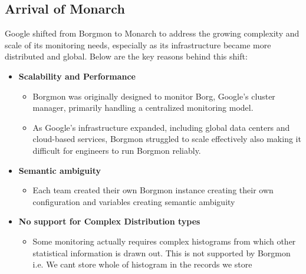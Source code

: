 \subsection{Arrival of Monarch\cite{50652}}

Google shifted from Borgmon to Monarch to address the growing complexity and scale of its monitoring needs, especially as its infrastructure became more distributed and global. Below are the key reasons behind this shift:

\begin{itemize}
    \item \textbf{Scalability and Performance}
    \begin{itemize}
        \item Borgmon was originally designed to monitor Borg, Google’s cluster manager, primarily handling a centralized monitoring model.
        \item As Google’s infrastructure expanded, including global data centers and cloud-based services, Borgmon struggled to scale effectively also making it difficult for engineers to run Borgmon reliably.
        
    \end{itemize}
    

    \item \textbf{Semantic ambiguity}
    \begin{itemize}
        \item Each team created their own Borgmon instance creating their own configuration and variables creating semantic ambiguity
    \end{itemize}

    \item \textbf{No support for Complex Distribution types}
    \begin{itemize}
        \item Some monitoring actually requires complex histograms from which other statistical information is drawn out. This is not supported by Borgmon i.e. We cant store whole of histogram in the records we store
    \end{itemize}
\end{itemize}




